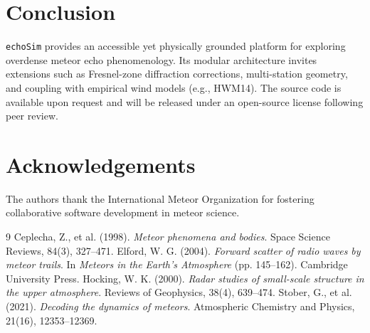 \documentclass[a4paper,11pt]{article}
\begin{document}
\section{Conclusion}

\texttt{echoSim} provides an accessible yet physically grounded platform for exploring overdense meteor echo phenomenology. Its modular architecture invites extensions such as Fresnel-zone diffraction corrections, multi-station geometry, and coupling with empirical wind models (e.g., HWM14). The source code is available upon request and will be released under an open-source license following peer review.

\section*{Acknowledgements}

The authors thank the International Meteor Organization for fostering collaborative software development in meteor science.

\begin{thebibliography}{9}
 Ceplecha, Z., et al. (1998). \textit{Meteor phenomena and bodies}. Space Science Reviews, 84(3), 327--471.
 Elford, W. G. (2004). \textit{Forward scatter of radio waves by meteor trails}. In \textit{Meteors in the Earth's Atmosphere} (pp. 145--162). Cambridge University Press.
 Hocking, W. K. (2000). \textit{Radar studies of small-scale structure in the upper atmosphere}. Reviews of Geophysics, 38(4), 639--474.
 Stober, G., et al. (2021). \textit{Decoding the dynamics of meteors}. Atmospheric Chemistry and Physics, 21(16), 12353--12369.
\end{thebibliography}
\end{document}
